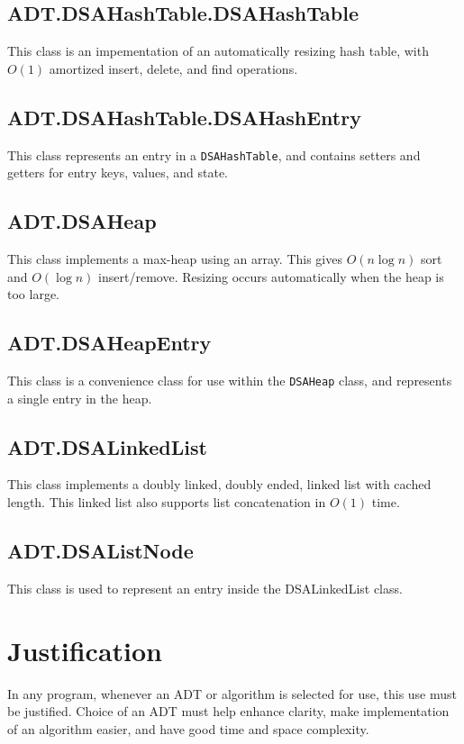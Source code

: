 \documentclass{article}
\begin{document}
\subsection{ADT.DSAHashTable.DSAHashTable}
This class is an impementation of an automatically resizing hash table,
with $O(1)$ amortized insert, delete, and find operations.

\subsection{ADT.DSAHashTable.DSAHashEntry}
This class represents an entry in a \texttt{DSAHashTable},
and contains setters and getters for entry keys, values, and state.

\subsection{ADT.DSAHeap}
This class implements a max-heap using an array.
This gives $O\left(n\log n\right)$ sort and $O\left(\log n\right)$ insert/remove.
Resizing occurs automatically when the heap is too large.

\subsection{ADT.DSAHeapEntry}
This class is a convenience class for use within the \texttt{DSAHeap} class,
and represents a single entry in the heap.

\subsection{ADT.DSALinkedList}
This class implements a doubly linked, doubly ended, linked list
with cached length. This linked list also supports list concatenation
in $O(1)$ time.

\subsection{ADT.DSAListNode}
This class is used to represent an entry inside the DSALinkedList class.

\section{Justification}
\label{sec:Justification}
In any program, whenever an ADT or algorithm is selected for use, this use must be justified.
Choice of an ADT must help enhance clarity, make implementation of an algorithm easier,
and have good time and space complexity.\\
\end{document}
